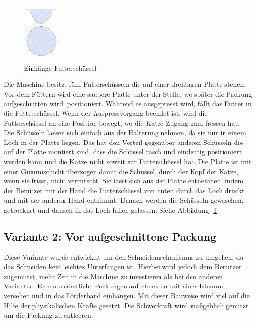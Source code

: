 \begin{figure}
\vspace{-40pt}
  \begin{center}
    \includegraphics[width=0.17\textwidth]{Bilder/Powerpoint/Loch_Futterschuessel}
  \end{center}
  \caption{Einhänge Futterschüssel}
  \label{Loch_Futterschuessel}
  \vspace{-10pt}
\end{figure}

Die Maschine besitzt fünf Futterschüsseln die auf einer drehbaren Platte stehen. Vor dem Füttern wird eine saubere Platte unter der Stelle, wo später die Packung aufgeschnitten wird, positioniert. Während es ausgepresst wird, fällt das Futter in die Futterschüssel. Wenn der Auspressvorgang beendet ist, wird die Futterschüssel an eine Position bewegt, wo die Katze Zugang zum fressen hat. Die Schüsseln lassen sich einfach aus der Halterung nehmen, da sie nur in einem Loch in der Platte liegen. Das hat den Vorteil gegenüber anderen Schüsseln die auf der Platte montiert sind, dass die Schüssel rasch und eindeutig positioniert werden kann und die Katze nicht soweit zur Futterschüssel hat. Die Platte ist mit einer Gummischicht überzogen damit die Schüssel, durch der Kopf der Katze, wenn sie frisst, nicht verrutscht. Sie lässt sich aus der Platte entnehmen, indem der Benutzer mit der Hand die Futterschüssel von unten durch das Loch drückt und mit der anderen Hand entnimmt. Danach werden die Schüsseln gewaschen, getrocknet und danach in das Loch fallen gelassen. Siehe Abbildung: \ref{Loch_Futterschuessel}



\subsection{Variante 2: Vor aufgeschnittene Packung }

Diese Variante wurde entwickelt um den Schneidemechanismus zu umgehen, da das Schneiden kein leichtes Unterfangen ist. Hierbei wird jedoch dem Benutzer zugemutet, mehr Zeit in die Maschine zu investieren als bei den anderen Varianten. Er muss sämtliche Packungen aufschneiden mit einer Klemme versehen und in das Förderband einhängen. Mit dieser Bauweise wird viel auf die Hilfe der physikalischen Kräfte gesetzt. Die Schwerkraft wird maßgeblich genutzt um die Packung zu entleeren.

